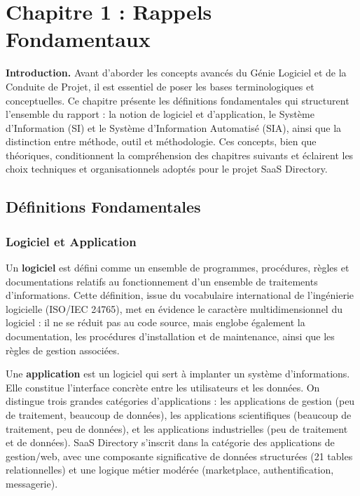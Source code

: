 ﻿%

\section{Chapitre 1 : Rappels Fondamentaux}

\textbf{Introduction.} Avant d'aborder les concepts avancés du Génie Logiciel et de la Conduite de Projet, il est essentiel de poser les bases terminologiques et conceptuelles. Ce chapitre présente les définitions fondamentales qui structurent l'ensemble du rapport : la notion de logiciel et d'application, le Système d'Information (SI) et le Système d'Information Automatisé (SIA), ainsi que la distinction entre méthode, outil et méthodologie. Ces concepts, bien que théoriques, conditionnent la compréhension des chapitres suivants et éclairent les choix techniques et organisationnels adoptés pour le projet SaaS Directory.

\subsection{Définitions Fondamentales}

\subsubsection{Logiciel et Application}

Un \textbf{logiciel} est défini comme un ensemble de programmes, procédures, règles et documentations relatifs au fonctionnement d'un ensemble de traitements d'informations. Cette définition, issue du vocabulaire international de l'ingénierie logicielle (ISO/IEC 24765), met en évidence le caractère multidimensionnel du logiciel : il ne se réduit pas au code source, mais englobe également la documentation, les procédures d'installation et de maintenance, ainsi que les règles de gestion associées.

Une \textbf{application} est un logiciel qui sert à implanter un système d'informations. Elle constitue l'interface concrète entre les utilisateurs et les données. On distingue trois grandes catégories d'applications : les applications de gestion (peu de traitement, beaucoup de données), les applications scientifiques (beaucoup de traitement, peu de données), et les applications industrielles (peu de traitement et de données). SaaS Directory s'inscrit dans la catégorie des applications de gestion/web, avec une composante significative de données structurées (21 tables relationnelles) et une logique métier modérée (marketplace, authentification, messagerie).

